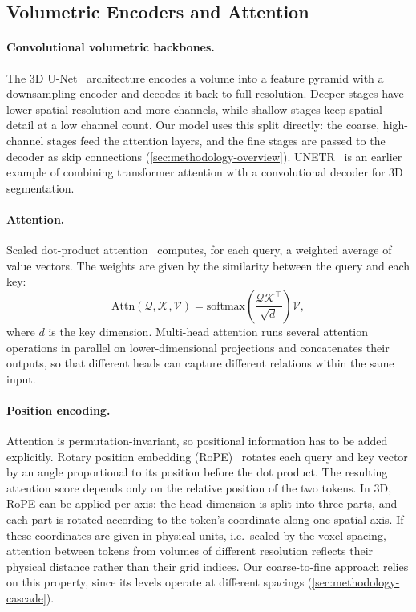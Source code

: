 \subsection{Volumetric Encoders and Attention}\label{sec:fundamentals-backbone}

\paragraph{Convolutional volumetric backbones.}
The 3D U-Net~\cite{cciccek20163d} architecture encodes a volume into a feature pyramid with a
downsampling encoder and decodes it back to full resolution. Deeper stages have lower spatial resolution and more channels, while shallow stages keep spatial detail at a low channel count. Our model uses this split directly: the coarse, high-channel stages feed the attention layers, and the fine stages are passed to the decoder as skip connections (\autoref{sec:methodology-overview}). UNETR~\cite{hatamizadeh2022unetr} is an earlier example of combining
transformer attention with a convolutional decoder for 3D segmentation.

\paragraph{Attention.}
Scaled dot-product attention~\cite{vaswani2017attention} computes, for each
query, a weighted average of value vectors. The weights are given by the
similarity between the query and each key:
%
\begin{equation}
  \mathrm{Attn}(\mathcal{Q},\mathcal{K},\mathcal{V}) = \mathrm{softmax}\!\left(\frac{\mathcal{Q}\mathcal{K}^\top}{\sqrt{d}}\right)\mathcal{V},
  \label{eq:attention}
\end{equation}
%
where $d$ is the key dimension. Multi-head attention runs several attention
operations in parallel on lower-dimensional projections and concatenates their
outputs, so that different heads can capture different relations within the
same input.

\paragraph{Position encoding.}
Attention is permutation-invariant, so positional information has to be added
explicitly. Rotary position embedding (RoPE)~\cite{su2021roformer} rotates each
query and key vector by an angle proportional to its position before the dot
product. The resulting attention score depends only on the relative position
of the two tokens. In 3D, RoPE can be applied per axis: the head dimension is
split into three parts, and each part is rotated according to the token's
coordinate along one spatial axis. If these coordinates are given in physical
units, i.e.\ scaled by the voxel spacing, attention between tokens from volumes
of different resolution reflects their physical distance rather than their grid
indices. Our coarse-to-fine approach relies on this property, since its levels operate at different spacings (\autoref{sec:methodology-cascade}).